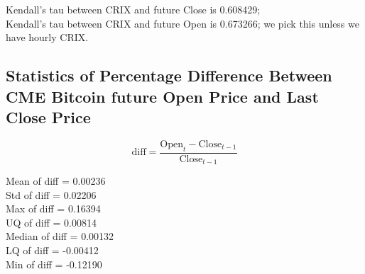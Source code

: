 Kendall's tau between CRIX and future Close is 0.608429;\\
Kendall's tau between CRIX and future Open is 0.673266; we pick this unless we have hourly CRIX.

\subsection{Statistics of Percentage Difference Between CME Bitcoin future Open Price and Last Close Price}

$$\text{diff} = \frac{\text{Open}_{t} - \text{Close}_{t-1}} {\text{Close}_{t-1}}$$

Mean of diff = 0.00236\\
Std of diff = 0.02206\\
Max of diff = 0.16394 \\
UQ of diff = 0.00814 \\
Median of diff = 0.00132\\
LQ of diff = -0.00412 \\
Min of diff = -0.12190 \\
